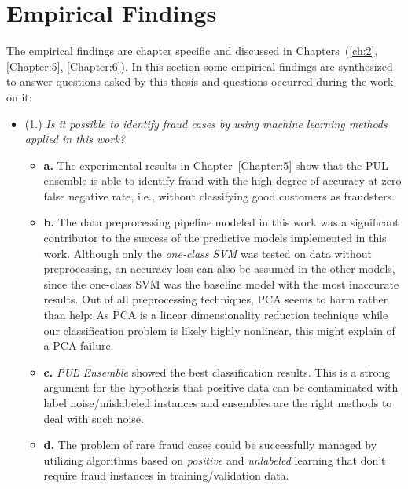 \section{Empirical Findings} \label{ch:ef}
The empirical findings are chapter specific and discussed in Chapters~(\ref{ch:2}, \ref{Chapter:5}, \ref{Chapter:6}). In this section some empirical findings are synthesized to answer questions asked by this thesis and questions occurred during the work on it:

\begin{itemize}
    
    \item (1.) \textit{Is it possible to identify fraud cases by using machine learning methods applied in this work?}
    \begin{itemize}     
    
        \item \textbf{a.} The experimental results in Chapter~\ref{Chapter:5} show that the PUL ensemble is able to identify fraud with the high degree of accuracy at zero false negative rate, i.e., without classifying good customers as fraudsters. 
        
        \item \textbf{b.} The data preprocessing pipeline modeled in this work was a significant contributor to the success of the predictive models implemented in this work. Although only the \textit{one-class SVM} was tested on data without preprocessing, an accuracy loss can also be assumed in the other models, since the one-class SVM was the baseline model with the most inaccurate results. Out of all preprocessing techniques, PCA seems to harm rather than help: As PCA is a linear dimensionality reduction technique while our classification problem is likely highly nonlinear, this might explain of a PCA failure. 
        
        \item \textbf{c.} \textit{PUL Ensemble} showed the best classification results. This is a strong argument for the hypothesis that positive data can be contaminated with label noise/mislabeled instances and ensembles are the right methods to deal with such noise.
        
        \item \textbf{d.} The problem of rare fraud cases could be successfully managed by utilizing algorithms based on \textit{positive} and \textit{unlabeled} learning that don't require fraud instances in training/validation data.
        

\end{itemize}
\end{itemize}
